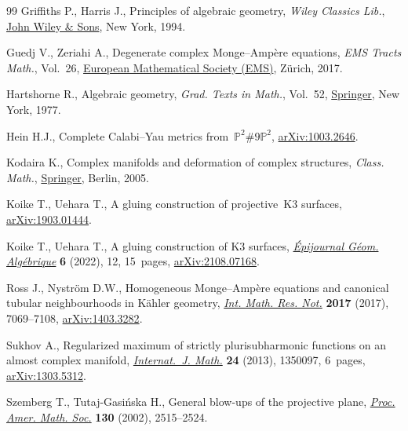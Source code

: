 \documentclass[10pt,a4paper]{amsart}
\numberwithin{equation}{section}
\def\overline#1{#1}
\begin{document}
\begin{thebibliography}{99}
Griffiths P., Harris J., Principles of algebraic geometry, \textit{Wiley Classics Lib.},
 \href{https://doi.org/10.1002/9781118032527}{John Wiley \& Sons}, New York,
 1994.

Guedj V., Zeriahi A., Degenerate complex {M}onge--{A}mp\`ere equations,
 \textit{EMS Tracts Math.}, Vol.~26,
 \href{https://doi.org/10.4171/167}{European Mathematical Society (EMS)},
 Z\"urich, 2017.

Hartshorne R., Algebraic geometry, \textit{Grad. Texts in Math.}, Vol.~52,
 \href{https://doi.org/10.1007/978-1-4757-3849-0}{Springer}, New York, 1977.

Hein H.J., Complete Calabi--Yau metrics
 from~$\mathbb{P}^2\#9\overline{\mathbb{P}}^2$,
 \href{http://arxiv.org/abs/1003.2646}{arXiv:1003.2646}.

Kodaira K., Complex manifolds and deformation of complex structures, \textit{Class.
 Math.}, \href{https://doi.org/10.1007/b138372}{Springer}, Berlin, 2005.

Koike T., Uehara T., A gluing construction of projective~{K}3 surfaces,
 \href{http://arxiv.org/abs/1903.01444}{arXiv:1903.01444}.

Koike T., Uehara T., A gluing construction of {K}3 surfaces,
 \href{https://doi.org/10.46298/epiga.2022.volume6.8504}{\textit{\'Epijournal
 G\'eom. Alg\'ebrique}} \textbf{6} (2022), 12, 15~pages,
 \href{http://arxiv.org/abs/2108.07168}{arXiv:2108.07168}.

Ross J., Nystr\"om D.W., Homogeneous {M}onge--{A}mp\`ere equations and
 canonical tubular neighbourhoods in {K}\"ahler geometry,
 \href{https://doi.org/10.1093/imrn/rnw200}{\textit{Int. Math. Res. Not.}}
 \textbf{2017} (2017), 7069--7108,
 \href{http://arxiv.org/abs/1403.3282}{arXiv:1403.3282}.

Sukhov A., Regularized maximum of strictly plurisubharmonic functions on an
 almost complex manifold,
 \href{https://doi.org/10.1142/S0129167X13500973}{\textit{Internat.~J. Math.}}
 \textbf{24} (2013), 1350097, 6~pages,
 \href{http://arxiv.org/abs/1303.5312}{arXiv:1303.5312}.

Szemberg T., Tutaj-Gasi\'nska H., General blow-ups of the projective plane,
 \href{https://doi.org/10.1090/S0002-9939-02-06488-2}{\textit{Proc. Amer.
 Math. Soc.}} \textbf{130} (2002), 2515--2524.


\end{thebibliography}
\end{document}
